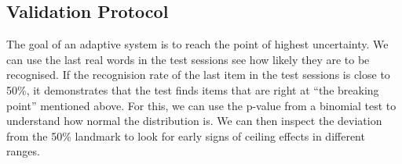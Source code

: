 \subsection{Validation Protocol}
The goal of an adaptive system is to reach the point of highest uncertainty. We can use the last real words in the test sessions see how likely they are to be recognised. If the recognision rate of the last item in the test sessions is close to 50\%, it demonstrates that the test finds items that are right at ``the breaking point'' mentioned above. For this, we can use the p-value from a binomial test to understand how normal the distribution is. We can then inspect the deviation from the 50\% landmark to look for early signs of ceiling effects in different ranges.
